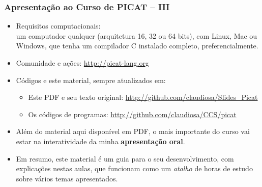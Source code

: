     
\begin{frame}[fragile]
  \frametitle{Apresentação ao Curso de PICAT -- III}
  \begin{itemize}

						
    \item Requisitos computacionais:\\
    \pause
    um computador qualquer (arquitetura 16, 32 ou 64 bits), com Linux, Mac ou Windows,
    que tenha um compilador C instalado completo, preferencialmente.

    \item Comunidade e ações: \url{http://picat-lang.org}
    
    \pause
    \item Códigos e este material, sempre atualizados em: 

    \pause
    \begin{itemize}
      \item  Este PDF e seu texto original:  \url{http://github.com/claudiosa/Slides_Picat}
     \item   Os códigos de programas:  \url{http://github.com/claudiosa/CCS/picat}
    \end{itemize}

			\item Além do material aqui disponível em PDF, o mais importante  do curso
			 vai estar na interatividade
			da minha \textbf{apresentação oral}. 
			
			\pause
			\item Em resumo, este material é  um guia para o seu desenvolvimento,
			 com explicações nestas aulas, que funcionam como um \textit{atalho} de
			horas de estudo sobre vários temas apresentados.

    
  \end{itemize}

\end{frame}

